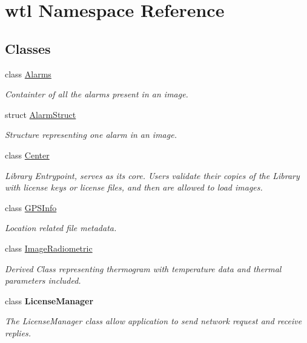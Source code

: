 \hypertarget{namespacewtl}{}\section{wtl Namespace Reference}
\label{namespacewtl}
\subsection*{Classes}
\begin{DoxyCompactItemize}
\item 
class \hyperlink{classwtl_1_1_alarms}{Alarms}
\begin{DoxyCompactList}\small\item\em Containter of all the alarms present in an image. \end{DoxyCompactList}\item 
struct \hyperlink{structwtl_1_1_alarm_struct}{Alarm\+Struct}
\begin{DoxyCompactList}\small\item\em Structure representing one alarm in an image. \end{DoxyCompactList}\item 
class \hyperlink{classwtl_1_1_center}{Center}
\begin{DoxyCompactList}\small\item\em Library Entrypoint, serves as its core. Users validate their copies of the Library with license keys or license files, and then are allowed to load images. \end{DoxyCompactList}\item 
class \hyperlink{classwtl_1_1_g_p_s_info}{G\+P\+S\+Info}
\begin{DoxyCompactList}\small\item\em Location related file metadata. \end{DoxyCompactList}\item 
class \hyperlink{classwtl_1_1_image_radiometric}{Image\+Radiometric}
\begin{DoxyCompactList}\small\item\em Derived Class representing thermogram with temperature data and thermal parameters included. \end{DoxyCompactList}\item 
class {\bfseries License\+Manager}
\begin{DoxyCompactList}\small\item\em The License\+Manager class allow application to send network request and receive replies. \end{DoxyCompactList}\item 

\end{DoxyCompactItemize}

